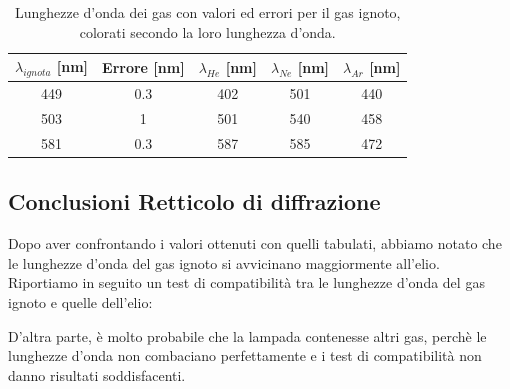 \documentclass[letterpaper,12pt]{article}
\begin{document}
\begin{table}[h!]
    \centering
    \begin{tabular}{|c|c|c|c|c|}
    \hline
    \textbf{$\lambda_{ignota}$} [nm] & \textbf{Errore} [nm] & \textbf{$\lambda_{He}$} [nm] & \textbf{$\lambda_{Ne}$} [nm] & \textbf{$\lambda_{Ar}$} [nm]\\
    \hline
    \cellcolor{wavelength_449} 449 & \cellcolor{wavelength_nan}0.3 & \cellcolor{wavelength_402} 402 & \cellcolor{wavelength_501} 501 & \cellcolor{wavelength_440} 440 \\
    \hline
    \cellcolor{wavelength_503} 503 & \cellcolor{wavelength_nan}1 & \cellcolor{wavelength_501} 501 & \cellcolor{wavelength_540} 540 & \cellcolor{wavelength_458} 458 \\
    \hline
    \cellcolor{wavelength_581} 581 & \cellcolor{wavelength_nan}0.3 & \cellcolor{wavelength_587} 587 & \cellcolor{wavelength_585} 585 & \cellcolor{wavelength_472} 472 \\
    \hline
    \end{tabular}
    \caption{Lunghezze d'onda dei gas con valori ed errori per il gas ignoto, colorati secondo la loro lunghezza d'onda.}
    \label{tab:reticolo_ignoto}
\end{table}

\subsection{Conclusioni Retticolo di diffrazione}

 
Dopo aver confrontando i valori ottenuti con quelli tabulati, abbiamo notato che le lunghezze d'onda del gas ignoto si avvicinano 
maggiormente all'elio.
Riportiamo in seguito un test di compatibilità tra le lunghezze d'onda del gas ignoto e quelle dell'elio:

 D'altra parte, è molto probabile che la lampada contenesse altri gas, perchè le lunghezze d'onda
non combaciano perfettamente e i test di compatibilità non danno risultati soddisfacenti. \\
\end{document}
